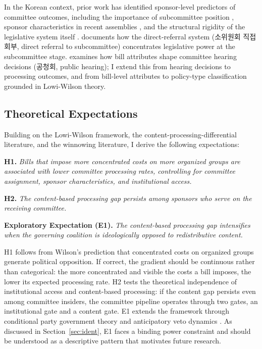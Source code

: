 \documentclass[11pt]{article}
\begin{document}
In the Korean context, prior work has identified sponsor-level predictors of committee outcomes, including the importance of subcommittee position \citep{kim2023}, sponsor characteristics in recent assemblies \citep{an2025}, and the structural rigidity of the legislative system itself \citep{kim2026}. \citet{park2026} documents how the direct-referral system (소위원회 직접회부, direct referral to subcommittee) concentrates legislative power at the subcommittee stage. \citet{kim2019} examines how bill attributes shape committee hearing decisions (공청회, public hearing); I extend this from hearing decisions to processing outcomes, and from bill-level attributes to policy-type classification grounded in Lowi-Wilson theory.

\subsection{Theoretical Expectations}

Building on the Lowi-Wilson framework, the content-processing-differential literature, and the winnowing literature, I derive the following expectations:

\medskip
\noindent\textbf{H1.} \textit{Bills that impose more concentrated costs on more organized groups are associated with lower committee processing rates, controlling for committee assignment, sponsor characteristics, and institutional access.}

\medskip
\noindent\textbf{H2.} \textit{The content-based processing gap persists among sponsors who serve on the receiving committee.}

\medskip
\noindent\textbf{Exploratory Expectation (E1).} \textit{The content-based processing gap intensifies when the governing coalition is ideologically opposed to redistributive content.}

\medskip
\noindent H1 follows from Wilson's prediction that concentrated costs on organized groups generate political opposition. If correct, the gradient should be continuous rather than categorical: the more concentrated and visible the costs a bill imposes, the lower its expected processing rate. H2 tests the theoretical independence of institutional access and content-based processing: if the content gap persists even among committee insiders, the committee pipeline operates through two gates, an institutional gate and a content gate. E1 extends the framework through conditional party government theory \citep{aldrich2001} and anticipatory veto dynamics \citep{cameron2000, fox2023}. As discussed in Section~\ref{sec:ident}, E1 faces a binding power constraint and should be understood as a descriptive pattern that motivates future research.
\end{document}
